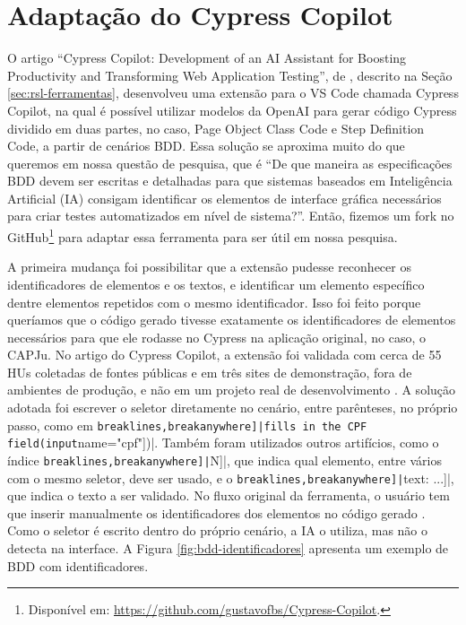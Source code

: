 \section{Adaptação do Cypress Copilot}
\label{sec:adaptacao-cypress-copilot}

O artigo ``Cypress Copilot: Development of an AI Assistant for Boosting Productivity and Transforming Web Application Testing'', de , descrito na Seção \ref{sec:rsl-ferramentas}, desenvolveu uma extensão para o VS Code chamada Cypress Copilot, na qual é possível utilizar modelos da OpenAI para gerar código Cypress dividido em duas partes, no caso, Page Object Class Code e Step Definition Code, a partir de cenários BDD. Essa solução se aproxima muito do que queremos em nossa questão de pesquisa, que é ``De que maneira as especificações BDD devem ser escritas e detalhadas para que sistemas baseados em Inteligência Artificial (IA) consigam identificar os elementos de interface gráfica necessários para criar testes automatizados em nível de sistema?''. Então, fizemos um fork no GitHub\footnote{Disponível em: \url{https://github.com/gustavofbs/Cypress-Copilot}.} para adaptar essa ferramenta para ser útil em nossa pesquisa.

A primeira mudança foi possibilitar que a extensão pudesse reconhecer os identificadores de elementos e os textos, e identificar um elemento específico dentre elementos repetidos com o mesmo identificador. Isso foi feito porque queríamos que o código gerado tivesse exatamente os identificadores de elementos necessários para que ele rodasse no Cypress na aplicação original, no caso, o CAPJu. No artigo do Cypress Copilot, a extensão foi validada com cerca de 55 HUs coletadas de fontes públicas e em três sites de demonstração, fora de ambientes de produção, e não em um projeto real de desenvolvimento \cite{Nettur2025}. A solução adotada foi escrever o seletor diretamente no cenário, entre parênteses, no próprio passo, como em \Verb[breaklines,breakanywhere]|fills in the CPF field(input[name="cpf"])|. Também foram utilizados outros artifícios, como o índice \Verb[breaklines,breakanywhere]|[N]|, que indica qual elemento, entre vários com o mesmo seletor, deve ser usado, e o \Verb[breaklines,breakanywhere]|[text: ...]|, que indica o texto a ser validado. No fluxo original da ferramenta, o usuário tem que inserir manualmente os identificadores dos elementos no código gerado \cite{Nettur2025}. Como o seletor é escrito dentro do próprio cenário, a IA o utiliza, mas não o detecta na interface. A Figura \ref{fig:bdd-identificadores} apresenta um exemplo de BDD com identificadores.

